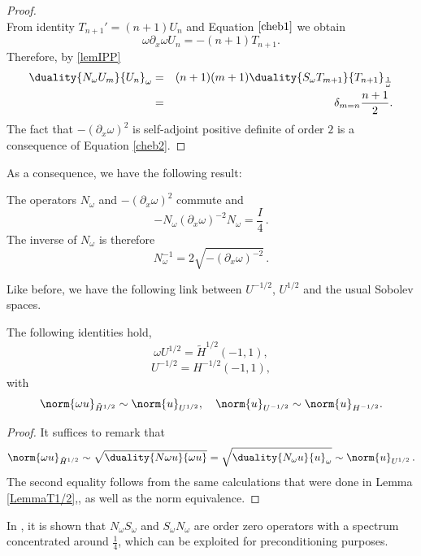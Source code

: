 \documentclass[a4paper]{article}
\begin{document}
	\begin{proof}
		\\
		From identity $T_{n+1}' = (n+1)U_n$ and Equation $\eqref{cheb1}$ we obtain
		\begin{equation*}
		\omega \partial_x \omega U_n = -(n+1) T_{n+1}.
		\end{equation*}
		Therefore, by \autoref{lemIPP}
		\begin{eqnarray*}
			\duality{N_\omega U_m}{U_n}_\omega & = & (n+1)(m+1)\duality{S_\omega T_{m+1}}{T_{n+1}}_\frac{1}{\omega}\\
			&=& \delta_{m=n} \frac{n+1}{2}.	
		\end{eqnarray*}
	The fact that $-(\partial_x \omega)^2$ is self-adjoint positive definite of order $2$ is a consequence of Equation \eqref{cheb2}.
	\end{proof}
	
	\noindent As a consequence, we have the following result:
	\begin{The} The operators $N_\omega$ and $-(\partial_x \omega)^2$ commute and 
		\[-N_\omega (\partial_x \omega)^{-2} N_{\omega} = \frac{I}{4}\,.\]
		The inverse of $N_\omega$ is therefore 
		\begin{equation}
		N_\omega^{-1} = 2\sqrt{-(\partial_x \omega)^{-2}}\,.
		\end{equation}
	\end{The}
	
	Like before, we have the following link between $U^{-1/2}$, $U^{1/2}$ and the usual Sobolev spaces. 
	\begin{Lem} The following identities hold, 
		\[\omega U^{1/2} = \tilde{H}^{1/2}(-1,1),\]
		\[ U^{-1/2} = H^{-1/2}(-1,1),\]
		with 
		\[\norm{\omega u}_{\tilde{H}^{1/2}} \sim \norm{u}_{U^{1/2}},\quad \norm{u}_{U^{-1/2}} \sim \norm{u}_{H^{-1/2}}.\]
		\label{lemU12H12}
	\end{Lem}
	\begin{proof} It suffices to remark that 
		\[ \norm{\omega u}_{\tilde{H}^{1/2}} \sim \sqrt{\duality{N\omega u}{\omega u}} = \sqrt{\duality{N_\omega u}{u}_\omega} \sim \norm{u}_{U^{1/2}}\,.\]
		The second equality follows from the same calculations that were done in Lemma \ref{LemmaT1/2},, as well as the norm equivalence. 
	\end{proof}
	
	
	In \cite{bruno2012second}, it is shown that $N_\omega S_\omega$ and $S_\omega N_\omega$ are order zero operators with a spectrum concentrated around $\frac{1}{4}$, which can be exploited for preconditioning purposes. 
	
\end{document}
